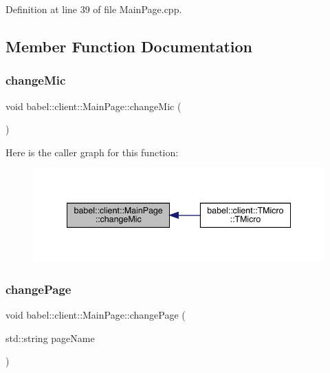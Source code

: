 Definition at line 39 of file Main\+Page.\+cpp.



\subsection{Member Function Documentation}
\mbox{\label{classbabel_1_1client_1_1_main_page_ac26005a5a71444e1f9d84852b642a5e3}} 
\subsubsection{\texorpdfstring{change\+Mic}{changeMic}}
{\footnotesize\ttfamily void babel\+::client\+::\+Main\+Page\+::change\+Mic (\begin{DoxyParamCaption}{ }\end{DoxyParamCaption})\hspace{0.3cm}{\ttfamily [signal]}}

Here is the caller graph for this function\+:\nopagebreak
\begin{figure}[H]
\begin{center}
\leavevmode
\includegraphics[width=341pt]{classbabel_1_1client_1_1_main_page_ac26005a5a71444e1f9d84852b642a5e3_icgraph}
\end{center}
\end{figure}
\mbox{\label{classbabel_1_1client_1_1_main_page_a074e02d9bc1d546bf91428a2d32b91ba}} 
\subsubsection{\texorpdfstring{change\+Page}{changePage}}
{\footnotesize\ttfamily void babel\+::client\+::\+Main\+Page\+::change\+Page (\begin{DoxyParamCaption}\item[{std\+::string}]{page\+Name }\end{DoxyParamCaption})\hspace{0.3cm}{\ttfamily [signal]}}

